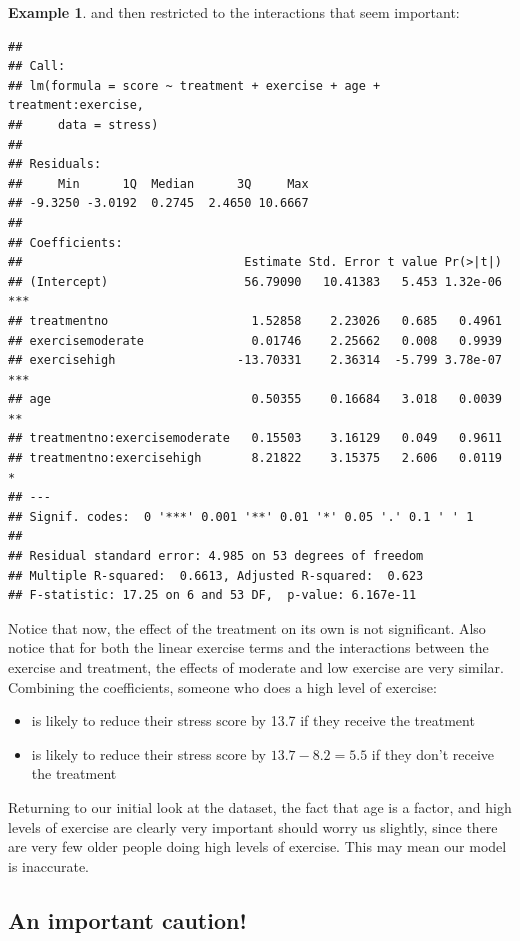 \documentclass[
  openany]{book}
\providecommand{\tightlist}{%
  \setlength{\itemsep}{0pt}\setlength{\parskip}{0pt}}
\theoremstyle{definition}
\theoremstyle{definition}
\newtheorem{example}{Example}[chapter]
\theoremstyle{definition}
\theoremstyle{definition}
\theoremstyle{remark}
\begin{document}
\begin{example}
and then restricted to the interactions that seem important:

\begin{verbatim}
## 
## Call:
## lm(formula = score ~ treatment + exercise + age + treatment:exercise, 
##     data = stress)
## 
## Residuals:
##     Min      1Q  Median      3Q     Max 
## -9.3250 -3.0192  0.2745  2.4650 10.6667 
## 
## Coefficients:
##                               Estimate Std. Error t value Pr(>|t|)    
## (Intercept)                   56.79090   10.41383   5.453 1.32e-06 ***
## treatmentno                    1.52858    2.23026   0.685   0.4961    
## exercisemoderate               0.01746    2.25662   0.008   0.9939    
## exercisehigh                 -13.70331    2.36314  -5.799 3.78e-07 ***
## age                            0.50355    0.16684   3.018   0.0039 ** 
## treatmentno:exercisemoderate   0.15503    3.16129   0.049   0.9611    
## treatmentno:exercisehigh       8.21822    3.15375   2.606   0.0119 *  
## ---
## Signif. codes:  0 '***' 0.001 '**' 0.01 '*' 0.05 '.' 0.1 ' ' 1
## 
## Residual standard error: 4.985 on 53 degrees of freedom
## Multiple R-squared:  0.6613, Adjusted R-squared:  0.623 
## F-statistic: 17.25 on 6 and 53 DF,  p-value: 6.167e-11
\end{verbatim}

Notice that now, the effect of the treatment on its own is not significant. Also notice that for both the linear exercise terms and the interactions between the exercise and treatment, the effects of moderate and low exercise are very similar.
Combining the coefficients, someone who does a high level of exercise:

\begin{itemize}
\tightlist
\item
  is likely to reduce their stress score by 13.7 if they receive the treatment
\item
  is likely to reduce their stress score by \(13.7 - 8.2 = 5.5\) if they don't receive the treatment
\end{itemize}

Returning to our initial look at the dataset, the fact that age is a factor, and high levels of exercise are clearly very important should worry us slightly, since there are very few older people doing high levels of exercise. This may mean our model is inaccurate.
\end{example}

\hypertarget{an-important-caution}{%
\subsection*{An important caution!}\label{an-important-caution}}
\end{document}
